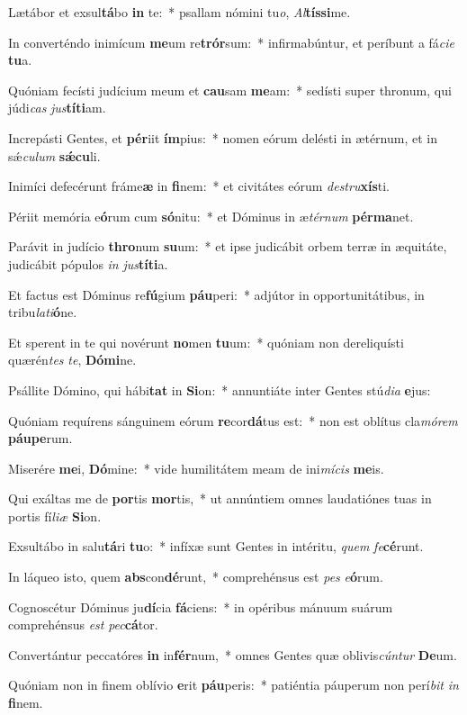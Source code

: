 \item Lætábor et exsul\textbf{tá}bo \textbf{in} te:~* psallam nómini tu\textit{o}, \textit{Al}\textbf{tís}\textbf{si}me.
\item In converténdo inimícum \textbf{me}um re\textbf{trór}sum:~* infirmabúntur, et períbunt a fá\textit{ci}\textit{e} \textbf{tu}a.
\item Quóniam fecísti judícium meum et \textbf{cau}sam \textbf{me}am:~* sedísti super thronum, qui júdi\textit{cas} \textit{jus}\textbf{tí}\textbf{ti}am.
\item Increpásti Gentes, et \textbf{pér}iit \textbf{ím}pius:~* nomen eórum delésti in ætérnum, et in sǽ\textit{cu}\textit{lum} \textbf{sǽ}\textbf{cu}li.
\item Inimíci defecérunt fráme\textbf{æ} in \textbf{fi}nem:~* et civitátes eórum \textit{de}\textit{stru}\textbf{xís}ti.
\item Périit memória e\textbf{ó}rum cum \textbf{só}nitu:~* et Dóminus in æ\textit{tér}\textit{num} \textbf{pér}\textbf{ma}net.
\item Parávit in judício \textbf{thro}num \textbf{su}um:~* et ipse judicábit orbem terræ in æquitáte, judicábit pópulos \textit{in} \textit{jus}\textbf{tí}\textbf{ti}a.
\item Et factus est Dóminus re\textbf{fú}gium \textbf{páu}peri:~* adjútor in opportunitátibus, in tribu\textit{la}\textit{ti}\textbf{ó}ne.
\item Et sperent in te qui novérunt \textbf{no}men \textbf{tu}um:~* quóniam non dereliquísti quærén\textit{tes} \textit{te}, \textbf{Dó}\textbf{mi}ne.
\item Psállite Dómino, qui hábi\textbf{tat} in \textbf{Si}on:~* annuntiáte inter Gentes stú\textit{di}\textit{a} \textbf{e}jus:
\item Quóniam requírens sánguinem eórum \textbf{re}cor\textbf{dá}tus est:~* non est oblítus cla\textit{mó}\textit{rem} \textbf{páu}\textbf{pe}rum.
\item Miserére \textbf{me}i, \textbf{Dó}mine:~* vide humilitátem meam de ini\textit{mí}\textit{cis} \textbf{me}is.
\item Qui exáltas me de \textbf{por}tis \textbf{mor}tis,~* ut annúntiem omnes laudatiónes tuas in portis fí\textit{li}\textit{æ} \textbf{Si}on.
\item Exsultábo in salu\textbf{tá}ri \textbf{tu}o:~* infíxæ sunt Gentes in intéritu, \textit{quem} \textit{fe}\textbf{cé}runt.
\item In láqueo isto, quem \textbf{abs}con\textbf{dé}runt,~* comprehénsus est \textit{pes} \textit{e}\textbf{ó}rum.
\item Cognoscétur Dóminus ju\textbf{dí}cia \textbf{fá}ciens:~* in opéribus mánuum suárum comprehénsus \textit{est} \textit{pec}\textbf{cá}tor.
\item Convertántur peccatóres \textbf{in} in\textbf{fér}num,~* omnes Gentes quæ oblivis\textit{cún}\textit{tur} \textbf{De}um.
\item Quóniam non in finem oblívio \textbf{e}rit \textbf{páu}peris:~* patiéntia páuperum non perí\textit{bit} \textit{in} \textbf{fi}nem.
